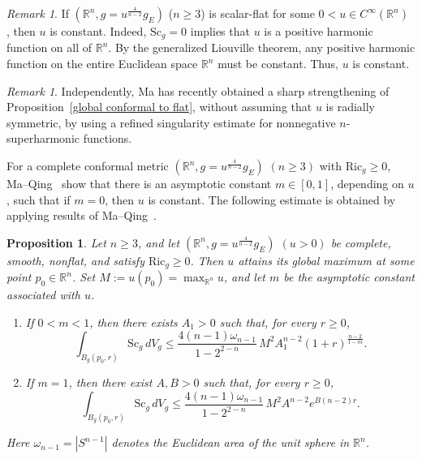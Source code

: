 \documentclass[12pt,oneside,a4paper]{article}
\newtheorem{proposition}[definition]{Proposition}
\theoremstyle{mytheorem}
\theoremstyle{remark}
\newtheorem{remark}[definition]{Remark}
\begin{document}
\begin{remark}
If $(\mathbb{R}^n, g = u^{\frac{4}{n-2}} g_{E})$ ($n \ge 3$) is scalar-flat for some $0 < u \in C^\infty(\mathbb{R}^n)$ , then $u$ is constant. Indeed, $\mathrm{Sc}_g = 0$ implies that $u$ is a positive harmonic function on all of $\mathbb{R}^n$. By the generalized Liouville theorem, any positive harmonic function on the entire Euclidean space $\mathbb{R}^n$ must be constant. Thus, $u$ is constant.
\end{remark}

\begin{remark}
Independently,  Ma \cite{2026arXiv260613979M} has recently obtained a sharp strengthening of Proposition~\ref{global conformal to flat}, without assuming that $u$ is radially symmetric, by using a refined singularity estimate for nonnegative $n$-superharmonic functions. 
\end{remark}

For a complete conformal metric
$(\mathbb{R}^n,g=u^{\frac{4}{n-2}}g_E)$ $(n\geq 3)$ with
$\mathrm{Ric}_g\geq 0$, Ma--Qing~\cite{zbMATH07420360} show that there
is an asymptotic constant $m\in[0,1]$, depending on $u$, such that if
$m=0$, then $u$ is constant. The following estimate is obtained by applying results of Ma--Qing~\cite{zbMATH07420360}.


\begin{proposition}\label{estimate}
Let $n\geq 3$, and let
$(\mathbb{R}^n,g=u^{\frac{4}{n-2}}g_E)$ $(u>0)$ be complete, smooth,
nonflat, and satisfy $\mathrm{Ric}_g\geq 0$. Then $u$ attains its global
maximum at some point $p_0\in\mathbb{R}^n$. Set
$M:=u(p_0)=\max_{\mathbb{R}^n}u$, and let $m$ be the asymptotic constant
associated with $u$.

\begin{enumerate}
\item[\rm(a)]
If $0<m<1$, then there exists $A_1>0$ such that, for every $r\geq 0$,
\begin{equation}\label{eq:scalar-bound-subcritical}
\int_{B_g(p_0,r)}\mathrm{Sc}_g\,dV_g
\leq
\frac{4(n-1)\omega_{n-1}}{1-2^{2-n}}\,
M^2A_1^{n-2}(1+r)^{\frac{n-2}{1-m}}.
\end{equation}

\item[\rm(b)]
If $m=1$, then there exist $A,B>0$ such that, for every $r\geq 0$,
\begin{equation}\label{eq:scalar-bound-critical}
\int_{B_g(p_0,r)}\mathrm{Sc}_g\,dV_g
\leq
\frac{4(n-1)\omega_{n-1}}{1-2^{2-n}}\,
M^2A^{n-2}e^{B(n-2)r}.
\end{equation}
\end{enumerate}
Here $\omega_{n-1}=|S^{n-1}|$ denotes the Euclidean area of the unit sphere
in $\mathbb{R}^n$.
\end{proposition}
\end{document}
